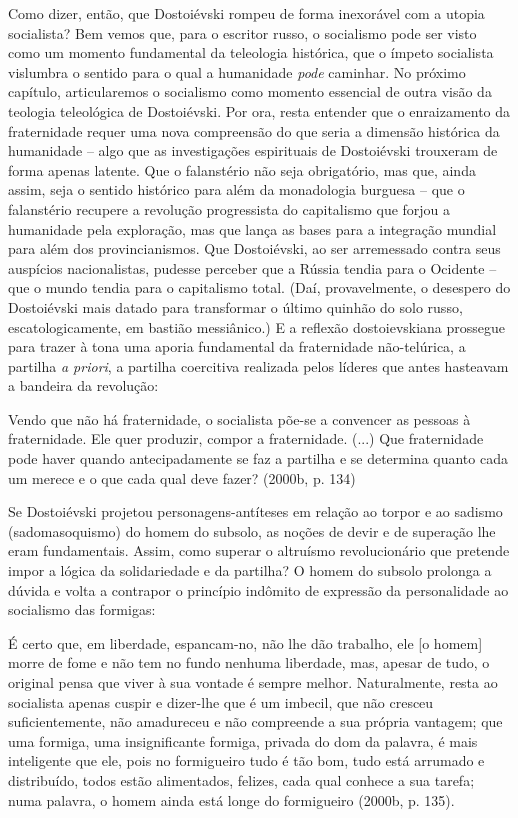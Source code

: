 Como dizer, então, que Dostoiévski rompeu de forma inexorável com a
utopia socialista? Bem vemos que, para o escritor russo, o socialismo
pode ser visto como um momento fundamental da teleologia histórica, que
o ímpeto socialista vislumbra o sentido para o qual a humanidade
\emph{pode} caminhar. No próximo capítulo, articularemos o socialismo
como momento essencial de outra visão da teologia teleológica de
Dostoiévski. Por ora, resta entender que o enraizamento da fraternidade
requer uma nova compreensão do que seria a dimensão histórica da
humanidade -- algo que as investigações espirituais de Dostoiévski
trouxeram de forma apenas latente. Que o falanstério não seja
obrigatório, mas que, ainda assim, seja o sentido histórico para além da
monadologia burguesa -- que o falanstério recupere a revolução
progressista do capitalismo que forjou a humanidade pela exploração, mas
que lança as bases para a integração mundial para além dos
provincianismos. Que Dostoiévski, ao ser arremessado contra seus
auspícios nacionalistas, pudesse perceber que a Rússia tendia para o
Ocidente -- que o mundo tendia para o capitalismo total. (Daí,
provavelmente, o desespero do Dostoiévski mais datado para transformar o
último quinhão do solo russo, escatologicamente, em bastião messiânico.)
E a reflexão dostoievskiana prossegue para trazer à tona uma aporia
fundamental da fraternidade não-telúrica, a partilha \emph{a priori}, a
partilha coercitiva realizada pelos líderes que antes hasteavam a
bandeira da revolução:

Vendo que não há fraternidade, o socialista põe-se a convencer as
pessoas à fraternidade. Ele quer produzir, compor a fraternidade. (...)
Que fraternidade pode haver quando antecipadamente se faz a partilha e
se determina quanto cada um merece e o que cada qual deve fazer? (2000b,
p. 134)

Se Dostoiévski projetou personagens-antíteses em relação ao torpor e ao
sadismo (sadomasoquismo) do homem do subsolo, as noções de devir e de
superação lhe eram fundamentais. Assim, como superar o altruísmo
revolucionário que pretende impor a lógica da solidariedade e da
partilha? O homem do subsolo prolonga a dúvida e volta a contrapor o
princípio indômito de expressão da personalidade ao socialismo das
formigas:

É certo que, em liberdade, espancam-no, não lhe dão trabalho, ele {[}o
homem{]} morre de fome e não tem no fundo nenhuma liberdade, mas, apesar
de tudo, o original pensa que viver à sua vontade é sempre melhor.
Naturalmente, resta ao socialista apenas cuspir e dizer-lhe que é um
imbecil, que não cresceu suficientemente, não amadureceu e não
compreende a sua própria vantagem; que uma formiga, uma insignificante
formiga, privada do dom da palavra, é mais inteligente que ele, pois no
formigueiro tudo é tão bom, tudo está arrumado e distribuído, todos
estão alimentados, felizes, cada qual conhece a sua tarefa; numa
palavra, o homem ainda está longe do formigueiro (2000b, p. 135).

